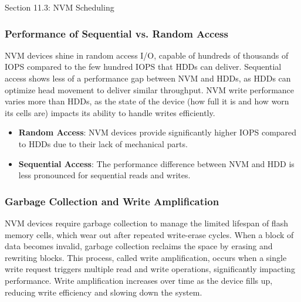 \begin{notes}{Section 11.3: NVM Scheduling}
\begin{highlight}
    \end{highlight}
    
    \subsubsection*{Performance of Sequential vs. Random Access}
    
    NVM devices shine in random access I/O, capable of hundreds of thousands of IOPS compared to the few hundred IOPS that HDDs can deliver. Sequential access shows less of a performance gap between 
    NVM and HDDs, as HDDs can optimize head movement to deliver similar throughput. NVM write performance varies more than HDDs, as the state of the device (how full it is and how worn its cells are) 
    impacts its ability to handle writes efficiently.
    
    \begin{highlight}
    
        \begin{itemize}
            \item \textbf{Random Access}: NVM devices provide significantly higher IOPS compared to HDDs due to their lack of mechanical parts.
            \item \textbf{Sequential Access}: The performance difference between NVM and HDD is less pronounced for sequential reads and writes.
        \end{itemize}
    
    \end{highlight}
    
    \subsubsection*{Garbage Collection and Write Amplification}
    
    NVM devices require garbage collection to manage the limited lifespan of flash memory cells, which wear out after repeated write-erase cycles. When a block of data becomes invalid, garbage collection 
    reclaims the space by erasing and rewriting blocks. This process, called write amplification, occurs when a single write request triggers multiple read and write operations, significantly impacting 
    performance. Write amplification increases over time as the device fills up, reducing write efficiency and slowing down the system.
    
    \begin{highlight}
    

\end{highlight}
\end{notes}
